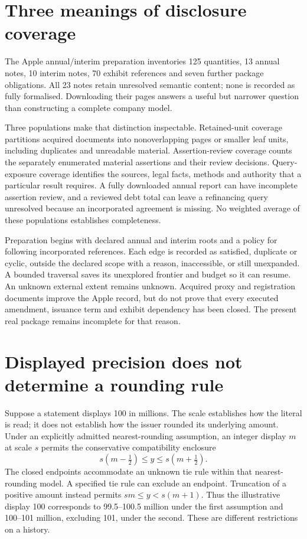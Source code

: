 \section{Three meanings of disclosure coverage}

The Apple annual/interim preparation inventories 125 quantities, 13 annual notes,
10 interim notes, 70 exhibit references and seven further package obligations.
All 23 notes retain unresolved semantic content; none is recorded as fully
formalised. Downloading their pages answers a useful but narrower question
than constructing a complete company model.

Three populations make that distinction inspectable. Retained-unit coverage
partitions acquired documents into nonoverlapping pages or smaller leaf units,
including duplicates and unreadable material. Assertion-review coverage counts
the separately enumerated material assertions and their review decisions.
Query-exposure coverage identifies the sources, legal facts, methods and
authority that a particular result requires. A fully downloaded annual report
can have incomplete assertion review, and a reviewed debt total can leave a
refinancing query unresolved because an incorporated agreement is missing.
No weighted average of these populations establishes completeness.

Preparation begins with declared annual and interim roots and a policy for
following incorporated references. Each edge is recorded as satisfied,
duplicate or cyclic, outside the declared scope with a reason, inaccessible,
or still unexpanded. A bounded traversal saves its unexplored frontier and
budget so it can resume. An unknown external extent remains unknown. Acquired
proxy and registration documents improve the Apple record, but do not prove
that every executed amendment, issuance term and exhibit dependency has been
closed. The present real package remains incomplete for that reason.

\section{Displayed precision does not determine a rounding rule}
\label{sec:source-rounding}

Suppose a statement displays 100 in millions. The scale establishes how the
literal is read; it does not establish how the issuer rounded its underlying
amount. Under an explicitly admitted nearest-rounding assumption, an integer
display $m$ at scale $s$ permits the conservative compatibility enclosure
\[
       s(m-\tfrac12)\leq y\leq s(m+\tfrac12).
\]
The closed endpoints accommodate an unknown tie rule within that nearest-rounding
model. A specified tie rule can exclude an endpoint. Truncation of a positive
amount instead permits $sm\leq y<s(m+1)$. Thus the illustrative display 100
corresponds to 99.5--100.5 million under the first assumption and 100--101 million,
excluding 101, under the second. These are different restrictions on a history.

